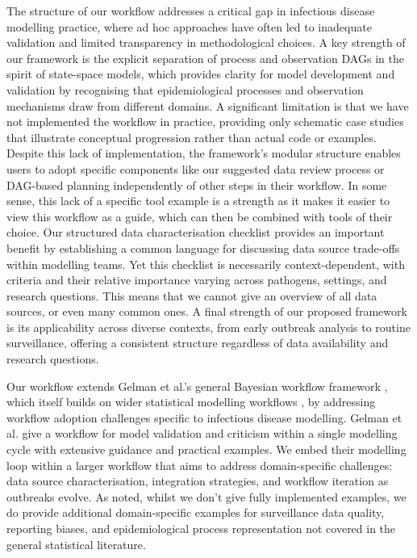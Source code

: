 \documentclass{article}
\begin{document}
The structure of our workflow addresses a critical gap in infectious disease modelling practice, where ad hoc approaches have often led to inadequate validation and limited transparency in methodological choices.
A key strength of our framework is the explicit separation of process and observation DAGs in the spirit of state-space models, which provides clarity for model development and validation by recognising that epidemiological processes and observation mechanisms draw from different domains.
A significant limitation is that we have not implemented the workflow in practice, providing only schematic case studies that illustrate conceptual progression rather than actual code or examples.
Despite this lack of implementation, the framework's modular structure enables users to adopt specific components like our suggested data review process or DAG-based planning independently of other steps in their workflow.
In some sense, this lack of a specific tool example is a strength as it makes it easier to view this workflow as a guide, which can then be combined with tools of their choice.
Our structured data characterisation checklist provides an important benefit by establishing a common language for discussing data source trade-offs within modelling teams.
Yet this checklist is necessarily context-dependent, with criteria and their relative importance varying across pathogens, settings, and research questions.
This means that we cannot give an overview of all data sources, or even many common ones.
A final strength of our proposed framework is its applicability across diverse contexts, from early outbreak analysis to routine surveillance, offering a consistent structure regardless of data availability and research questions.


Our workflow extends Gelman et al.'s general Bayesian workflow framework \citep{gelman2020bayesian}, which itself builds on wider statistical modelling workflows \citep{box1979robustness,Box1980,green2003highly}, by addressing workflow adoption challenges specific to infectious disease modelling.
Gelman et al. give a workflow for model validation and criticism within a single modelling cycle with extensive guidance and practical examples.
We embed their modelling loop within a larger workflow that aims to address domain-specific challenges: data source characterisation, integration strategies, and workflow iteration as outbreaks evolve. 
As noted, whilst we don't give fully implemented examples, we do provide additional domain-specific examples for surveillance data quality, reporting biases, and epidemiological process representation not covered in the general statistical literature.
 
\end{document}
